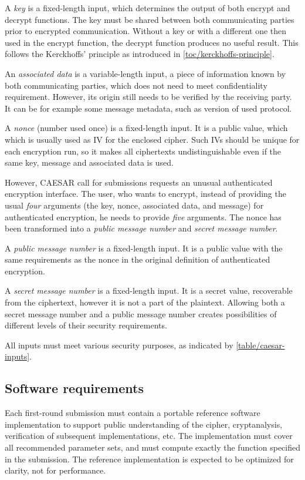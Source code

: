 A \textit{key} is a fixed-length input, which determines the output of both encrypt and decrypt functions. The key must be shared between both communicating parties prior to encrypted communication. Without a key or with a different one then used in the encrypt function, the decrypt function produces no useful result. This follows the Kerckhoffs' principle as introduced in \autoref{toc/kerckhoffs-principle}.

An \textit{associated data} is a variable-length input, a piece of information known by both communicating parties, which does not need to meet confidentiality requirement. However, its origin still needs to be verified by the receiving party. It can be for example some message metadata, such as version of used protocol.

A \textit{nonce} (number used once) is a fixed-length input. It is a public value, which which is usually used as IV for the enclosed cipher. Such IVs should be unique for each encryption run, so it makes all ciphertexts undistinguishable even if the same key, message and associated data is used.

However, CAESAR call for submissions requests an unusual authenticated encryption interface. The user, who wants to encrypt, instead of providing the usual \textit{four} arguments (the key, nonce, associated data, and message) for authenticated encryption, he needs to provide \textit{five} arguments. The nonce has been transformed into a \textit{public message number} and \textit{secret message number}. \cite{cryptoeprint:2013:242}

A \textit{public message number} is a fixed-length input. It is a public value with the same requirements as the nonce in the original definition of authenticated encryption.

A \textit{secret message number} is a fixed-length input. It is a secret value, recoverable from the ciphertext, however it is not a part of the plaintext. Allowing both a secret message number and a public message number creates possibilities of different levels of their security requirements.

All inputs must meet various security purposes, as indicated by \autoref{table/caesar-inputs}.


\subsection{Software requirements}
\label{toc/caesar-api}

Each first-round submission must contain a portable reference software implementation to support public understanding of the cipher, cryptanalysis, verification of subsequent implementations, etc. The implementation must cover all recommended parameter sets, and must compute exactly the function specified in the submission. The reference implementation is expected to be optimized for clarity, not for performance. \cite{crypto-competitions}

